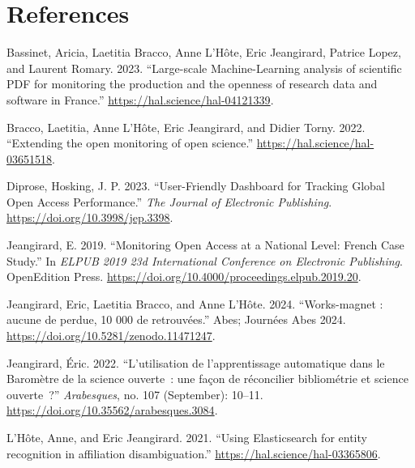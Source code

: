 \documentclass[
]{article}
\newlength{\cslhangindent}
\newenvironment{cslreferences}%
  {\setlength{\parindent}{0pt}%
  \everypar{\setlength{\hangindent}{\cslhangindent}}\ignorespaces}%
  {\par}
\begin{document}
\hypertarget{references}{%
\section*{References}\label{references}}

\hypertarget{refs}{}
\begin{cslreferences}
\leavevmode\hypertarget{ref-bassinet:hal-04121339}{}%
Bassinet, Aricia, Laetitia Bracco, Anne L'Hôte, Eric Jeangirard, Patrice
Lopez, and Laurent Romary. 2023. ``Large-scale Machine-Learning analysis
of scientific PDF for monitoring the production and the openness of
research data and software in France.''
\url{https://hal.science/hal-04121339}.

\leavevmode\hypertarget{ref-bracco:hal-03651518}{}%
Bracco, Laetitia, Anne L'Hôte, Eric Jeangirard, and Didier Torny. 2022.
``Extending the open monitoring of open science.''
\url{https://hal.science/hal-03651518}.

\leavevmode\hypertarget{ref-coki}{}%
Diprose, Hosking, J. P. 2023. ``User-Friendly Dashboard for Tracking
Global Open Access Performance.'' \emph{The Journal of Electronic
Publishing}. \url{https://doi.org/10.3998/jep.3398}.

\leavevmode\hypertarget{ref-jeangirard_monitoring_2019}{}%
Jeangirard, E. 2019. ``Monitoring Open Access at a National Level:
French Case Study.'' In \emph{ELPUB 2019 23d International Conference on
Electronic Publishing}. OpenEdition Press.
\url{https://doi.org/10.4000/proceedings.elpub.2019.20}.

\leavevmode\hypertarget{ref-jeangirard:hal-04598201}{}%
Jeangirard, Eric, Laetitia Bracco, and Anne L'Hôte. 2024. ``Works-magnet
: aucune de perdue, 10 000 de retrouvées.'' Abes; Journées Abes 2024.
\url{https://doi.org/10.5281/zenodo.11471247}.

\leavevmode\hypertarget{ref-jeangirard:hal-03819060}{}%
Jeangirard, Éric. 2022. ``L'utilisation de l'apprentissage automatique
dans le Baromètre de la science ouverte~: une façon de réconcilier
bibliométrie et science ouverte~?'' \emph{Arabesques}, no. 107
(September): 10--11. \url{https://doi.org/10.35562/arabesques.3084}.

\leavevmode\hypertarget{ref-lhote:hal-03365806}{}%
L'Hôte, Anne, and Eric Jeangirard. 2021. ``Using Elasticsearch for
entity recognition in affiliation disambiguation.''
\url{https://hal.science/hal-03365806}.
\end{cslreferences}
\end{document}
